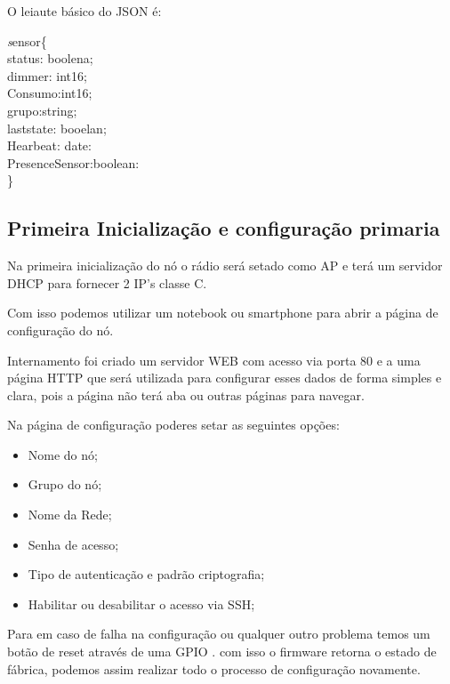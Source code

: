\documentclass[openright]{normas-utf-tex} %
\begin{document}
O leiaute básico do JSON é:

\begin{center}
\textit
sensor\{\\ 
status: boolena; \\
dimmer: int16;\\
Consumo:int16; \\
grupo:string;\\
laststate: booelan;\\
Hearbeat: date: \\
PresenceSensor:boolean:\\
\}
\end{center}
\subsection{Primeira Inicialização e configuração primaria}


Na primeira inicialização do nó o rádio será setado como AP e terá um servidor DHCP para fornecer 2 IP's classe C.

Com isso podemos utilizar um notebook ou smartphone para abrir a página de configuração do nó.

Internamento foi criado um servidor WEB com acesso via porta 80 e a uma página HTTP que será utilizada para configurar esses dados de forma simples e clara, pois a página não terá aba ou outras páginas para navegar.

Na página de configuração poderes setar as seguintes opções:
\begin{itemize}
    \item Nome do nó;
    \item Grupo do nó;
    \item Nome da Rede;
    \item Senha de acesso;
    \item Tipo de autenticação e padrão criptografia;
    \item Habilitar ou desabilitar o acesso via SSH;
\end{itemize}

Para em caso de falha na configuração ou qualquer outro problema temos um botão de reset através de uma GPIO  \cite{Elsevier}. com isso o firmware retorna o estado de fábrica, podemos assim realizar todo o processo de configuração novamente.
\end{document}
